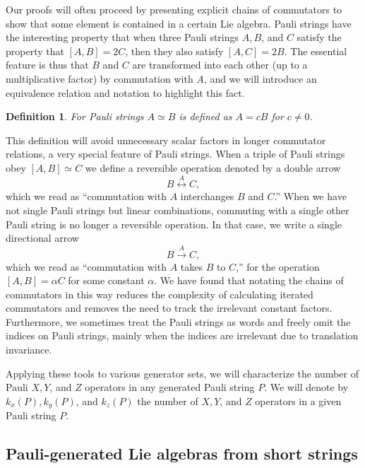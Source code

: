 \documentclass[12pt, a4-paper]{amsart}
\numberwithin{equation}{section}
\newtheorem{defi}[lemma]{Definition}
\begin{document}
Our proofs will often proceed by presenting explicit chains of commutators to show that some element is contained in a certain Lie algebra. Pauli strings have the interesting property that when three Pauli strings $A, B$, and $C$ satisfy the property that $[A,B]= 2C$, then they also satisfy $[A,C] = 2B$. The essential feature is thus that $B$ and $C$ are transformed into each other (up to a multiplicative factor) by commutation with $A$, and we will introduce an equivalence relation and notation to highlight this fact.
\begin{defi} For Pauli strings $A\simeq B$ is defined as $A=cB$ for $c\neq 0$. 
\end{defi} 
This definition will avoid unnecessary scalar factors in longer commutator relations, a very special feature of Pauli strings. When a triple of Pauli strings obey $[A,B]\simeq C$ we define a reversible operation denoted by a double arrow
\begin{equation}
    B\stackrel{A}{\longleftrightarrow}C,
\end{equation} 
which we read as ``commutation with $A$ interchanges $B$ and $C$.'' 
When we have not single Pauli strings but linear combinations, commuting with a single other Pauli string is no longer a reversible operation. In that case, we write a single directional arrow
\begin{equation}
    B\stackrel{A}{\longrightarrow}C,
\end{equation} 
which we read as ``commutation with $A$ takes $B$ to $C$,'' for the operation $[A, B] = \alpha C$ for some constant $\alpha$. We have found that notating the chains of commutators in this way reduces the complexity of calculating iterated commutators and removes the need to track the irrelevant constant factors. Furthermore, we sometimes treat the Pauli strings as words and freely omit the indices on Pauli strings, mainly when the indices are irrelevant due to translation invariance.

Applying these tools to various generator sets, we will characterize the number of Pauli $X, Y$, and $Z$ operators in any generated Pauli string $P$. We will denote by $k_x(P), k_y(P)$, and $k_z(P)$ the number of $X, Y$, and $Z$ operators in a given Pauli string $P$.


\subsection{Pauli-generated Lie algebras from short strings}\label{sec:Pauli_Lie}
\end{document}
